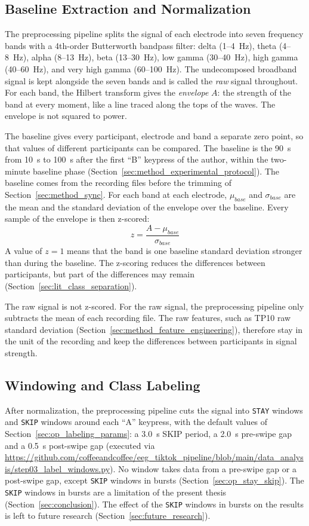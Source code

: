 \documentclass[12pt,a4paper]{report}
\begin{document}
\subsection{Baseline Extraction and Normalization}
\label{sec:method_baseline}
The preprocessing pipeline splits the signal of each electrode into seven frequency bands with a 4th-order Butterworth bandpass filter: delta (1--4~Hz), theta (4--8~Hz), alpha (8--13~Hz), beta (13--30~Hz), low gamma (30--40~Hz), high gamma (40--60~Hz), and very high gamma (60--100~Hz). The undecomposed broadband signal is kept alongside the seven bands and is called the \emph{raw} signal throughout. For each band, the Hilbert transform gives the \emph{envelope} \(A\): the strength of the band at every moment, like a line traced along the tops of the waves. The envelope is not squared to power.

The baseline gives every participant, electrode and band a separate zero point, so that values of different participants can be compared. The baseline is the 90~s from 10~s to 100~s after the first ``B'' keypress of the author, within the two-minute baseline phase (Section~\ref{sec:method_experimental_protocol}). The baseline comes from the recording files before the trimming of Section~\ref{sec:method_sync}. For each band at each electrode, \(\mu_{base}\) and \(\sigma_{base}\) are the mean and the standard deviation of the envelope over the baseline. Every sample of the envelope is then z-scored:
\begin{equation}
    z = \frac{A - \mu_{base}}{\sigma_{base}}
    \label{eq:zscore}
\end{equation}
A value of \(z = 1\) means that the band is one baseline standard deviation stronger than during the baseline. The z-scoring reduces the differences between participants, but part of the differences may remain (Section~\ref{sec:lit_class_separation}).

The raw signal is not z-scored. For the raw signal, the preprocessing pipeline only subtracts the mean of each recording file. The raw features, such as TP10 raw standard deviation (Section~\ref{sec:method_feature_engineering}), therefore stay in the unit of the recording and keep the differences between participants in signal strength.

\subsection{Windowing and Class Labeling}
\label{sec:method_windowing}
After normalization, the preprocessing pipeline cuts the signal into \texttt{STAY} windows and \texttt{SKIP} windows around each ``A'' keypress, with the default values of Section~\ref{sec:op_labeling_params}: a 3.0~s SKIP period, a 2.0~s pre-swipe gap and a 0.5~s post-swipe gap (executed via \url{https://github.com/coffeeandcoffee/eeg_tiktok_pipeline/blob/main/data_analysis/step03_label_windows.py}). No window takes data from a pre-swipe gap or a post-swipe gap, except \texttt{SKIP} windows in bursts (Section~\ref{sec:op_stay_skip}). The \texttt{SKIP} windows in bursts are a limitation of the present thesis (Section~\ref{sec:conclusion}). The effect of the \texttt{SKIP} windows in bursts on the results is left to future research (Section~\ref{sec:future_research}).
\end{document}
